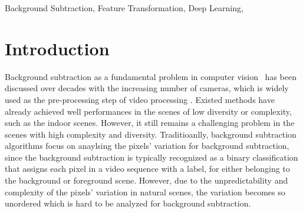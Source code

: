 \documentclass[journal]{IEEEtran}
\begin{document}
\begin{IEEEkeywords} 
    Background Subtraction, Feature Transformation, Deep Learning,
\end{IEEEkeywords}

\IEEEpeerreviewmaketitle

\section{Introduction}
Background subtraction as a fundamental problem in computer vision\ \cite{Bouwmans201431} has been discussed over decades with the increasing number of cameras,
which is widely used as the pre-processing step of video processing \cite{Barnich2011_2011_TIP}.
Existed methods have already achieved well performances in the scenes of low diversity or complexity, such as the indoor scenes.
However, it still remains a challenging problem in the scenes with high complexity and diversity.
Traditioanlly, background subtraction algorithms focus on anaylsing the pixels' variation for background subtraction,
since the background subtraction is typically recognized as a binary classification that assigns each pixel in a video sequence with a label, 
for either belonging to the background or foreground scene.
However, due to the unpredictability and complexity of the pixels' variation in natural scenes,
the variation becomes so unordered which is hard to be analyzed for background subtraction.
\end{document}
